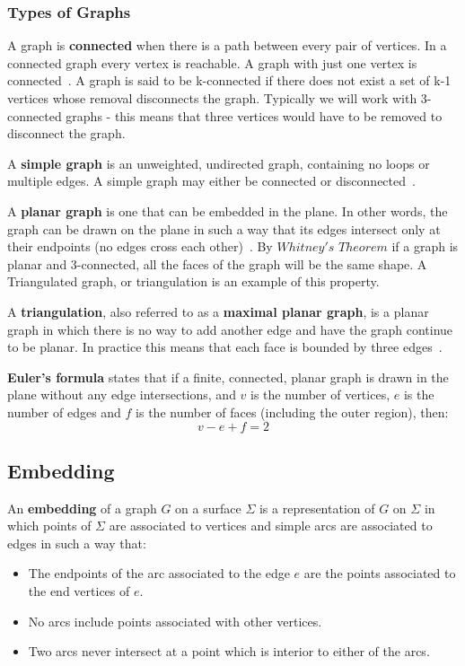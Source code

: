 \documentclass{article}
\begin{document}
 \subsubsection{Types of Graphs}
  A graph is \textbf{connected} when there is a path between every pair of vertices. 
  In a connected graph every vertex is reachable. A graph with just one vertex is connected~\citep{mathworld:ConnectedGraphs}. A graph is said to be k-connected if there does not exist a set of k-1 vertices whose removal disconnects the graph. Typically we will work with 3-connected graphs - this means that three vertices would have to be removed to disconnect the graph.
  
  A \textbf{simple graph} is an unweighted, undirected graph, containing no loops or multiple edges. 
  A simple graph may either be connected or disconnected~\citep{mathworld:SimpleGraphs}.
  
  A \textbf{planar graph} is one that can be embedded in the plane. 
  In other words, the graph can be drawn on the plane in such a way that its edges intersect only at their endpoints (no edges cross each other)~\citep{mathworld:PlanarGraph}. By $Whitney's$ $Theorem$ if a graph is planar and 3-connected, all the faces of the graph will be the same shape. A Triangulated graph, or triangulation is an example of this property.
  
  A \textbf{triangulation}, also referred to as a \textbf{maximal planar graph}, is a planar graph in which there is no way to add another edge and have the graph continue to be planar. In practice this means that each face is bounded by three edges~\citep{mathworld:Triangulation}.
  
  \textbf{Euler's formula} states that if a finite, connected, planar graph is drawn in the plane without any edge intersections, and $v$ is the number of vertices, $e$ is the number of edges and $f$ is the number of faces (including the outer region), then: 
  \begin{equation} 
	v-e+f=2
  \end{equation}
  
  \subsection{Embedding}
  An \textbf{embedding} of a graph $G$ on a surface $\Sigma$ is a representation of $G$ on $\Sigma$ in which points of $\Sigma$ are associated to vertices and simple arcs are associated to edges in such a way that:
  \begin{itemize}
	\item The endpoints of the arc associated to the edge $e$ are the points associated to the end vertices of $e$.
	\item No arcs include points associated with other vertices.
	\item Two arcs never intersect at a point which is interior to either of the arcs.
  \end{itemize}
\end{document}

